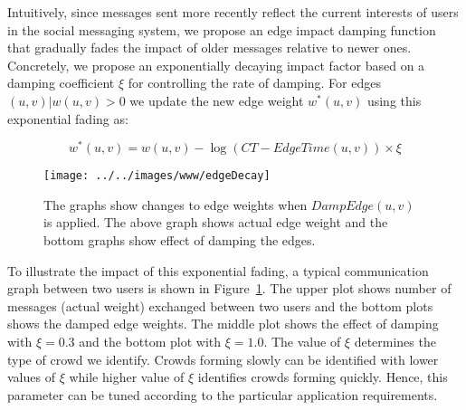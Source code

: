 \documentclass{sig-alternate}
\begin{document}
Intuitively, since messages sent more recently reflect the current interests of
users in the social messaging system, we propose an edge impact damping function
that gradually fades the impact of older messages relative to newer ones.
Concretely, we propose an exponentially decaying impact factor based on a damping
coefficient  $\xi$ for controlling the rate of damping. For edges $(u, v) |
w(u,v) > 0 $ we  update the new edge weight $w^*(u, v)$ using this exponential fading as:

\[
w^*(u, v) = w(u, v)- \log(CT - EdgeTime(u, v))\times \xi
\]







\begin{figure}[!t]
\begin{center}
\texttt{[image: ../../images/www/edgeDecay]}
\caption{The graphs show changes to edge weights when $DampEdge(u, v)$ is
applied. The above graph shows actual edge weight and the bottom graphs show
effect of damping the edges.}
\label{fig:edge-decay}
\end{center}
\end{figure}


To illustrate the impact of this exponential fading, a typical communication graph between two users is shown in Figure~\ref{fig:edge-decay}.
The upper plot shows number of messages (actual weight) exchanged between two users
and the bottom plots shows the damped edge weights. The middle plot shows the effect of damping with $\xi = 0.3$ and
the bottom plot with $\xi = 1.0$. The value of $\xi$ determines the type of
crowd we identify. Crowds forming slowly can be identified with lower values
of $\xi$ while higher value of $\xi$ identifies crowds forming quickly.
Hence, this parameter can be tuned according to the particular application requirements. 
\end{document}
